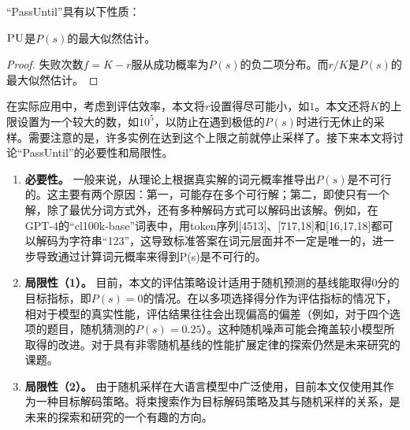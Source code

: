 “PassUntil”具有以下性质：
\begin{theorem}
$\textsc{PU}$是$P(s)$的最大似然估计。
\end{theorem}

\begin{proof}
失败次数$f = K - r$服从成功概率为$P(s)$的负二项分布。而$r/K$是$P(s)$的最大似然估计。
\end{proof}


在实际应用中，考虑到评估效率，本文将$r$设置得尽可能小，如$1$。本文还将$K$的上限设置为一个较大的数，如$10^5$，以防止在遇到极低的$P(s)$时进行无休止的采样。需要注意的是，许多实例在达到这个上限之前就停止采样了。接下来本文将讨论“PassUntil”的必要性和局限性。

\begin{enumerate}
    \item \textbf{必要性。} 一般来说，从理论上根据真实解的词元概率推导出$P(s)$是不可行的。这主要有两个原因：第一，可能存在多个可行解；第二，即使只有一个解，除了最优分词方式外，还有多种解码方式可以解码出该解。例如，在GPT-4的“cl100k-base”词表中，用token序列[4513]、[717,18]和[16,17,18]都可以解码为字符串“123”，这导致标准答案在词元层面并不一定是唯一的，进一步导致通过计算词元概率来得到P(s)是不可行的。
    \item \textbf{局限性（1）。} 目前，本文的评估策略设计适用于随机预测的基线能取得0分的目标指标，即$P(s) = 0$的情况。在以多项选择得分作为评估指标的情况下，相对于模型的真实性能，评估结果往往会出现偏高的偏差（例如，对于四个选项的题目，随机猜测的$P(s) = 0.25$）。这种随机噪声可能会掩盖较小模型所取得的改进。对于具有非零随机基线的性能扩展定律的探索仍然是未来研究的课题。
    \item \textbf{局限性（2）。} 由于随机采样在大语言模型中广泛使用，目前本文仅使用其作为一种目标解码策略。将束搜索作为目标解码策略及其与随机采样的关系，是未来的探索和研究的一个有趣的方向。 
\end{enumerate}


